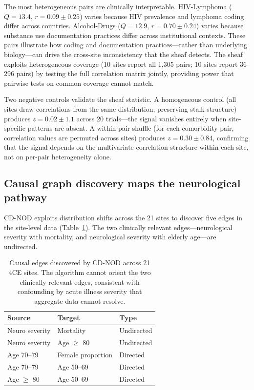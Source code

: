 \documentclass{article}
\begin{document}
The most heterogeneous pairs are clinically interpretable.
HIV-Lymphoma ($Q = 13.4$, $r = 0.09 \pm 0.25$) varies because HIV prevalence and lymphoma coding differ across countries.
Alcohol-Drugs ($Q = 12.9$, $r = 0.70 \pm 0.24$) varies because substance use documentation practices differ across institutional contexts.
These pairs illustrate how coding and documentation practices---rather than underlying biology---can drive the cross-site inconsistency that the sheaf detects.
The sheaf exploits heterogeneous coverage (10 sites report all 1,305 pairs; 10 sites report 36--296 pairs) by testing the full correlation matrix jointly, providing power that pairwise tests on common coverage cannot match.

Two negative controls validate the sheaf statistic.
A homogeneous control (all sites draw correlations from the same distribution, preserving stalk structure) produces $z = 0.02 \pm 1.1$ across 20 trials---the signal vanishes entirely when site-specific patterns are absent.
A within-pair shuffle (for each comorbidity pair, correlation values are permuted across sites) produces $z = 0.30 \pm 0.84$, confirming that the signal depends on the multivariate correlation structure within each site, not on per-pair heterogeneity alone.


\subsection{Causal graph discovery maps the neurological pathway}

CD-NOD \cite{huang2020cdnod} exploits distribution shifts across the 21 sites to discover five edges in the site-level data (Table~\ref{tab:cdnod}).
The two clinically relevant edges---neurological severity with mortality, and neurological severity with elderly age---are undirected.

\begin{table}[t]
\centering
\caption{Causal edges discovered by CD-NOD across 21 4CE sites. The algorithm cannot orient the two clinically relevant edges, consistent with confounding by acute illness severity that aggregate data cannot resolve.}
\label{tab:cdnod}
\begin{tabular}{lll}
\toprule
Source & Target & Type \\
\midrule
Neuro severity & Mortality & Undirected \\
Neuro severity & Age $\geq$ 80 & Undirected \\
Age 70--79 & Female proportion & Directed \\
Age 70--79 & Age 50--69 & Directed \\
Age $\geq$ 80 & Age 50--69 & Directed \\
\bottomrule
\end{tabular}
\end{table}
\end{document}
